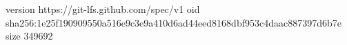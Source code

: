 version https://git-lfs.github.com/spec/v1
oid sha256:1e25f190909550a516e9c3e9a410d6ad44eed8168dbf953c4daac887397d6b7e
size 349692

